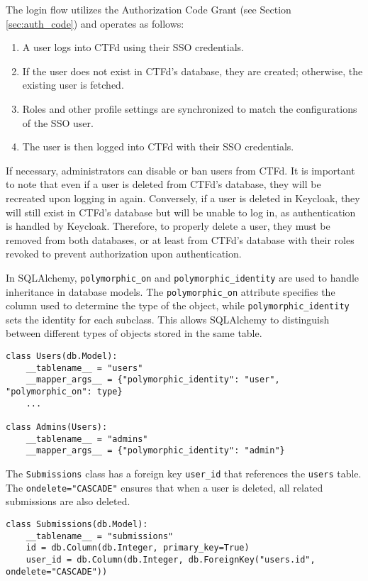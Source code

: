 The login flow utilizes the Authorization Code Grant (see Section \ref{sec:auth_code}) and operates as follows:

\begin{enumerate}
    \item A user logs into CTFd using their SSO credentials.
    \item If the user does not exist in CTFd's database, they are created; otherwise, the existing user is fetched.
    \item Roles and other profile settings are synchronized to match the configurations of the SSO user.
    \item The user is then logged into CTFd with their SSO credentials.
\end{enumerate}

If necessary, administrators can disable or ban users from CTFd. It is important to note that even if a user is deleted from CTFd's database, they will be recreated upon logging in again. Conversely, if a user is deleted in Keycloak, they will still exist in CTFd's database but will be unable to log in, as authentication is handled by Keycloak. Therefore, to properly delete a user, they must be removed from both databases, or at least from CTFd's database with their roles revoked to prevent authorization upon authentication.

In SQLAlchemy, \texttt{polymorphic\_on} and \texttt{polymorphic\_identity} are used to handle inheritance in database models. The \texttt{polymorphic\_on} attribute specifies the column used to determine the type of the object, while \texttt{polymorphic\_identity} sets the identity for each subclass. This allows SQLAlchemy to distinguish between different types of objects stored in the same table.

\begin{verbatim}
class Users(db.Model):
    __tablename__ = "users"
    __mapper_args__ = {"polymorphic_identity": "user", "polymorphic_on": type}
    ...

class Admins(Users):
    __tablename__ = "admins"
    __mapper_args__ = {"polymorphic_identity": "admin"}
\end{verbatim}

The \texttt{Submissions} class has a foreign key \texttt{user\_id} that references the \texttt{users} table. The \texttt{ondelete="CASCADE"} ensures that when a user is deleted, all related submissions are also deleted.

\begin{verbatim}
class Submissions(db.Model):
    __tablename__ = "submissions"
    id = db.Column(db.Integer, primary_key=True)
    user_id = db.Column(db.Integer, db.ForeignKey("users.id", ondelete="CASCADE"))
\end{verbatim}

